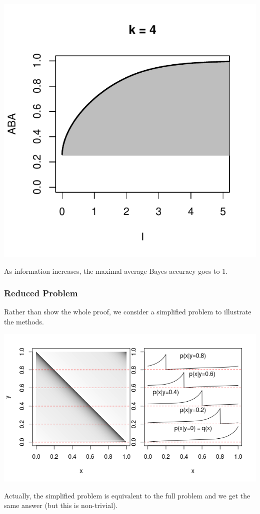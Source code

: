\documentclass{beamer}
\begin{document}
\begin{frame}
\begin{center}
\includegraphics[scale = 0.34]{ck_4.pdf}
\end{center}
As information increases, the maximal average Bayes accuracy goes to 1.


\end{frame}

\begin{frame}
\frametitle{Reduced Problem}
Rather than show the whole proof, we consider a simplified problem to illustrate the methods.
\begin{center}
\includegraphics[scale = 0.5]{../diagram/qxplot.png}
\end{center}

Actually, the simplified problem is equivalent to the full problem and we get the same answer (but this is non-trivial).
\end{frame}
\end{document}

